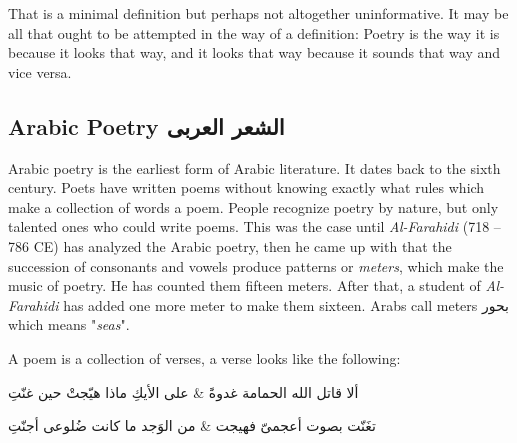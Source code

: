 \documentclass[12pt]{report}
\begin{document}
That is a minimal definition but perhaps not altogether uninformative. It may be all that ought to be attempted in the way of a definition: Poetry is the way it is because it looks that way, and it looks that way because it sounds that way and vice versa.



\subsection{Arabic Poetry \textarabic{الشعر العربى}}
Arabic poetry is the earliest form of Arabic literature. It dates back to the sixth century. Poets have written poems without knowing exactly what rules which make a collection of words a poem. People recognize poetry by nature, but only talented ones who could write poems. %
This was the case until \textit{Al-Farahidi} (718 – 786 CE) has analyzed the
Arabic poetry, then he came up with that the succession of consonants and vowels
produce patterns or \textit{meters}, which make the music of poetry.  He has
counted them fifteen meters.  After that, a student of \textit{Al-Farahidi} has
added one more meter to make them sixteen. Arabs call meters \textarabic{بحور}
which means "\textit{seas}".

\bigskip

A poem is a collection of verses, a verse looks like the following:%

\vspace{0.5cm}
\begin{Arabic}
  \begin{traditionalpoem*}

    ألا قاتل الله الحمامة غدوةً \quad & \quad على الأيكِ ماذا هيّجتْ حين غنّتِ

    تغَنّت بصوت أعجمىّ فهيجت  \quad & \quad من الوَجد ما كانت ضُلوعى أجنّتِ
  \end{traditionalpoem*}
\end{Arabic}%
\vspace{0.5cm}
\end{document}
